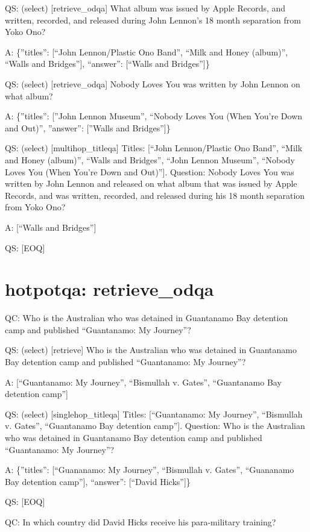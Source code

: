 \documentclass[
]{article}
\begin{document}
QS: (select) {[}retrieve\_odqa{]} What album was issued by Apple
Records, and written, recorded, and released during John Lennon's 18
month separation from Yoko Ono?

A: \{''titles'': {[}``John Lennon/Plastic Ono Band'', ``Milk and Honey
(album)'', ``Walls and Bridges''{]}, ``answer'': {[}``Walls and
Bridges''{]}\}

QS: (select) {[}retrieve\_odqa{]} Nobody Loves You was written by John
Lennon on what album?

A: \{''titles'': {[}''John Lennon Museum'', ``Nobody Loves You (When
You're Down and Out)'', ''answer'': {[}''Walls and Bridges''{]}\}

QS: (select) {[}multihop\_titleqa{]} Titles: {[}``John Lennon/Plastic
Ono Band'', ``Milk and Honey (album)'', ``Walls and Bridges'', ``John
Lennon Museum'', ``Nobody Loves You (When You're Down and Out)''{]}.
Question: Nobody Loves You was written by John Lennon and released on
what album that was issued by Apple Records, and was written, recorded,
and released during his 18 month separation from Yoko Ono?

A: {[}``Walls and Bridges''{]}

QS: {[}EOQ{]}

\section{hotpotqa: retrieve\_odqa}\label{hotpotqa-retrieve_odqa}

QC: Who is the Australian who was detained in Guantanamo Bay detention
camp and published ``Guantanamo: My Journey''?

QS: (select) {[}retrieve{]} Who is the Australian who was detained in
Guantanamo Bay detention camp and published ``Guantanamo: My Journey''?

A: {[}``Guantanamo: My Journey'', ``Bismullah v. Gates'', ``Guantanamo
Bay detention camp''{]}

QS: (select) {[}singlehop\_titleqa{]} Titles: {[}``Guantanamo: My
Journey'', ``Bismullah v. Gates'', ``Guantanamo Bay detention camp''{]}.
Question: Who is the Australian who was detained in Guantanamo Bay
detention camp and published ``Guantanamo: My Journey''?

A: \{''titles'': {[}``Guananamo: My Journey'', ``Bismullah v. Gates'',
``Guananamo Bay detention camp''{]}, ``answer'': {[}``David Hicks''{]}\}

QS: {[}EOQ{]}

QC: In which country did David Hicks receive his para-military training?
\end{document}
